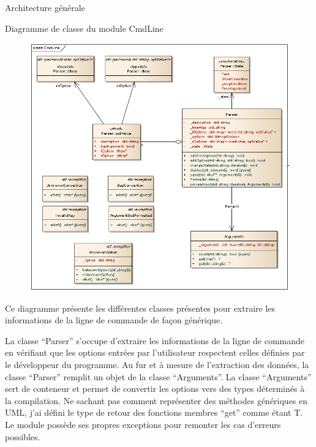 \documentclass{article}
\begin{document}
\begin{section}{Architecture générale}

  \begin{subsection}{Diagramme de classe du module CmdLine}
    \begin{figure}[htp]
      \begin{center}
	\includegraphics[scale=0.5]{./diagrammeClasse_cmdLine.png}
      \end{center}
    \end{figure}
    \FloatBarrier
      Ce diagramme présente les différentes classes présentes pour extraire les informations de la ligne de commande de façon générique.
      
      La classe ``Parser'' s'occupe d'extraire les informations de la ligne de commande en vérifiant que les options entrées par l'utilisateur
      respectent celles définies par le développeur du programme. Au fur et à mesure de l'extraction des données, la classe ``Parser'' remplit
      un objet de la classe ``Arguments''. La classe ``Arguments'' sert de conteneur et permet de convertir les options vers des types déterminés
      à la compilation. Ne sachant pas comment représenter des méthodes génériques en UML, j'ai défini le type de retour des fonctions membres
      ``get'' comme étant T. Le module possède ses propres exceptions pour remonter les cas d'erreurs possibles.
   \end{subsection}
   

\end{section}
\end{document}
